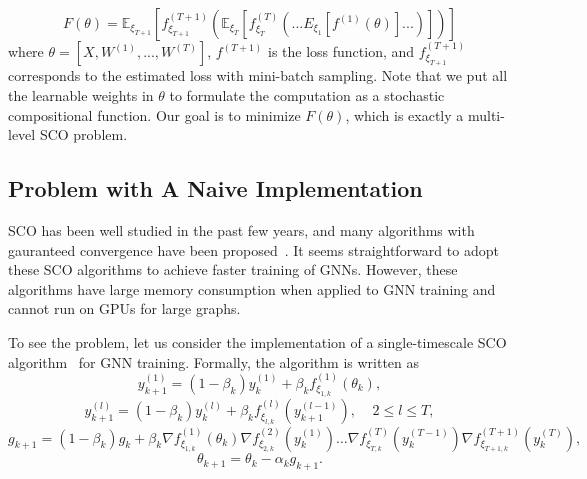 \begin{equation}
\label{eq:loss}
    F(\theta) = \mathbb{E}_{\xi_{T+1}}\left[ f_{\xi_{T+1}}^{(T+1)}\left( \mathbb{E}_{\xi_{T}}\left[f_{\xi_{T}}^{(T)}\left(...{E}_{\xi_1}[f^{(1)}(\theta)]...\right)\right] \right) \right]
\end{equation}
where $\theta=[X, W^{(1)}, ..., W^{(T)}]$, $f^{(T+1)}$ is the loss function, and $f_{\xi_{T+1}}^{(T+1)}$ corresponds to the estimated loss with mini-batch sampling. 
Note that we put all the learnable weights in $\theta$ to formulate the computation as a stochastic compositional function. 
Our goal is to minimize $F(\theta)$, which is exactly a multi-level SCO problem.  



\subsection{Problem with A Naive Implementation}
SCO has been well studied in the past few years, and many algorithms with gauranteed convergence have been proposed~\cite{zhang2019multi, yang2019multilevel,  chen2020solving, yang2019multilevel, balasubramanian2020stochastic, chen2020solving, lian2017finite, wang2017accelerating, ghadimi2020single}. 
It seems straightforward to adopt these SCO algorithms to achieve faster training of GNNs. 
However, these algorithms have large memory consumption when applied to GNN training and cannot run on GPUs for large graphs.  

To see the problem, let us consider the implementation of a single-timescale SCO algorithm~\cite{balasubramanian2020stochastic} for GNN training. 
Formally, the algorithm is written as 
\begin{equation}
  \label{eq:alg_step1}
             y^{(1)}_{k+1} = (1-\beta_{k})y^{(1)}_k + \beta_{k}  f^{(1)}_{\xi_{1,k}}(\theta_{k}),
 \end{equation}
\begin{equation}
         \label{eq:alg_step2}
      y^{(l)}_{k+1} = (1-\beta_{k})y^{(l)}_k + \beta_{k}  f^{(l)}_{\xi_{l,k}}(y^{(l-1)}_{k+1}), \;\;\;\; 2\le l \le T,
 \end{equation}
 \begin{equation}
  \label{eq:alg_step3}
g_{k+1} = (1-\beta_{k})g_{k} + \beta_{k} \nabla f_{\xi_{1,k}}^{(1)}(\theta_k) \nabla f_{\xi_{2,k}}^{(2)}(y^{(1)}_k)\ldots \nabla  f_{\xi_{T,k}}^{(T)}(y^{(T-1)}_k)\nabla f_{\xi_{T+1,k}}^{(T+1)}(y^{(T)}_k),
\end{equation}
 \begin{equation}
  \label{eq:alg_step4}
\theta_{k+1} = \theta_{k} - \alpha_k g_{k+1}.
\end{equation}

